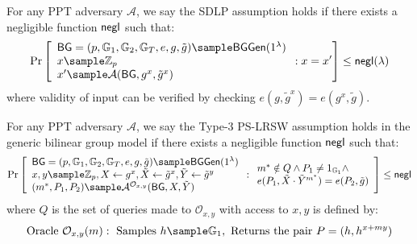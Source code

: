 \begin{definition}\label{sdlp}
For any PPT adversary $\mathcal{A}$, we say the SDLP assumption holds if there exists a negligible function $\mathsf{negl}$ such that:
$$\Pr\left[\begin{array}{l}
    \BG = (p, \G_1, \G_2, \G_T, e, g, \tilde{g}) \sample \BGGen(1^\lambda) \\
    x \sample \Z_p \\
    x' \sample \mathcal{A}(\BG, g^x, \tilde{g}^x)
\end{array} : x = x'\right] \leq \negl(\lambda)$$
where validity of input can be verified by checking $e(g, \tilde{g}^x) = e(g^x, \tilde{g})$.
\end{definition} 


\begin{definition}
For any PPT adversary $\mathcal{A}$, we say the Type-3 PS-LRSW assumption holds in the generic bilinear group model if there exists a negligible function $\mathsf{negl}$ such that:
$$\Pr\left[\begin{array}{l}
    \BG = (p, \G_1, \G_2, \G_T, e, g, \tilde{g}) \sample \BGGen(1^\lambda) \\
    x,y \sample \Z_p, X \gets g^x, \tilde{X} \gets \tilde{g}^x, \tilde{Y} \gets \tilde{g}^y \\
    (m^*, P_1, P_2) \sample \mathcal{A}^{\mathcal{O}_{x,y}}(\BG, X, \tilde{Y})
\end{array} : \begin{array}{l}
    m^* \notin Q \land P_1 \neq 1_{\G_1} \land \\
    e(P_1, \tilde{X} \cdot \tilde{Y}^{m^*}) = e(P_2, \tilde{g})
\end{array}\right] \leq \negl$$
where $Q$ is the set of queries made to $\mathcal{O}_{x,y}$ with access to $x,y$ is defined by:
\[
\text{Oracle }\mathcal{O}_{x,y}(m): \text{ Samples } h \sample \G_1, \text{ Returns the pair } P = (h, h^{x+my})
\]

\end{definition}





% 
% 


























